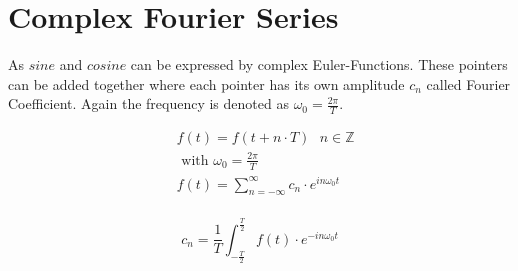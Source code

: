 \documentclass[./\jobname.tex]{subfiles}
\begin{document}
\section{Complex Fourier Series}
As $sine$ and $cosine$ can be expressed by complex Euler-Functions. These pointers can be added together where each pointer has its own amplitude $c_n$ called Fourier Coefficient. Again the frequency is denoted as $\omega_0 = \frac{2 \pi}{T}$. 


\begin{equation}
	\begin{split}
		& f(t) = f(t + n \cdot T) \text{    $n \in \mathbb{Z}$} \\
		& \text{ with } \omega_0 = \frac{2 \pi}{T} \\
		& f(t) = \sum_{n = -\infty}^{\infty} c_n \cdot e^{in\omega_0 t} \\
	\end{split}
\end{equation}


\begin{equation}
	c_n = \frac{1}{T} \int_{-\frac{T}{2}}^{\frac{T}{2}} f(t) \cdot e^{- i n \omega_0 t}
\end{equation}


\begin{table}[H]
	\centering
	\noindent{}
\end{table}

\newpage
\end{document}
